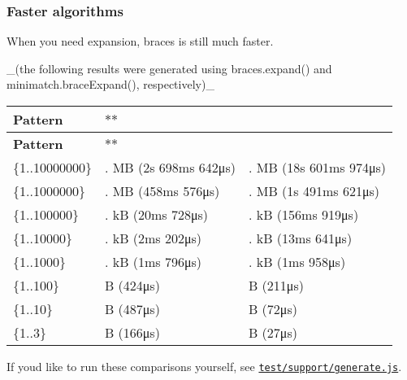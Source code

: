 \subsubsection*{Faster algorithms}

When you need expansion, braces is still much faster.

\+\_\+(the following results were generated using {\ttfamily braces.\+expand()} and {\ttfamily minimatch.\+brace\+Expand()}, respectively)\+\_\+

\tabulinesep=1mm
\begin{longtabu} spread 0pt [c]{*{3}{|X[-1]}|}
\hline
\rowcolor{\tableheadbgcolor}\textbf{ {\bfseries Pattern}  }&\\
\endfirsthead
\hline
\endfoot
\hline
\rowcolor{\tableheadbgcolor}\textbf{ {\bfseries Pattern}  }&\\
\endhead
{\ttfamily \{1..10000000\}}  &{. MB} (2s 698ms 642μs)  &{. MB} (18s 601ms 974μs)   \\
{\ttfamily \{1..1000000\}}  &{. MB} (458ms 576μs)  &{. MB} (1s 491ms 621μs)   \\
{\ttfamily \{1..100000\}}  &{. kB} (20ms 728μs)  &{. kB} (156ms 919μs)   \\
{\ttfamily \{1..10000\}}  &{. kB} (2ms 202μs)  &{. kB} (13ms 641μs)   \\
{\ttfamily \{1..1000\}}  &{. kB} (1ms 796μs)  &{. kB} (1ms 958μs)   \\
{\ttfamily \{1..100\}}  &{ B} (424μs)  &{ B} (211μs)   \\
{\ttfamily \{1..10\}}  &{ B} (487μs)  &{ B} (72μs)   \\
{\ttfamily \{1..3\}}  &{ B} (166μs)  &{ B} (27μs)   \\
\end{longtabu}


If you\textquotesingle{}d like to run these comparisons yourself, see \href{test/support/generate.js}{\tt test/support/generate.\+js}.

